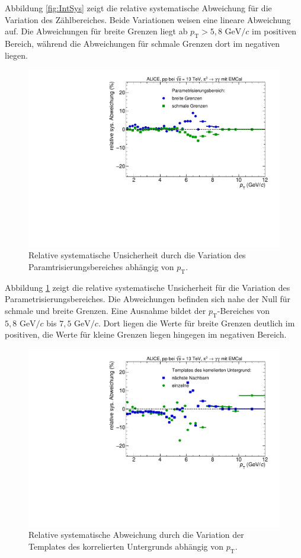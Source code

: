 \newline
Abbildung \ref{fig:IntSys} zeigt die relative systematische Abweichung für die Variation des Zählbereiches.
Beide Variationen weisen eine lineare Abweichung auf.
Die Abweichungen für breite Grenzen liegt ab $p_\text{T} > 5,8 \text{ GeV}/c$ im positiven Bereich, während die Abweichungen für schmale Grenzen dort im negativen liegen.
\begin{figure}[t!]
\centering
\includegraphics[width=.65\linewidth]{YieldsSysUncerFitRange_Data_2016.pdf}
\caption{Relative systematische Unsicherheit durch die Variation des Paramtrisierungsbereiches abhängig von $p_\text{T}$.}
\label{fig:ParamSys}
\end{figure}
\newline
Abbildung \ref{fig:ParamSys} zeigt die relative systematische Unsicherheit für die Variation des Parametrisierungsbereiches.
Die Abweichungen befinden sich nahe der Null für schmale und breite Grenzen.
Eine Ausnahme bildet der $p_\text{T}$-Bereiches von $5,8 \text{ GeV}/c$ bis $7,5 \text{ GeV}/c$.
Dort liegen die Werte für breite Grenzen deutlich im positiven, die Werte für kleine Grenzen liegen hingegen im negativen Bereich.
\begin{figure}[t!]
\centering
\includegraphics[width=.65\linewidth]{YieldsSysUncerBkgVariation_Data_2016.pdf}
\caption{Relative systematische Abweichung durch die Variation der Templates des korrelierten Untergrunds abhängig von $p_\text{T}$.}
\label{fig:BkgSys}
\end{figure}
